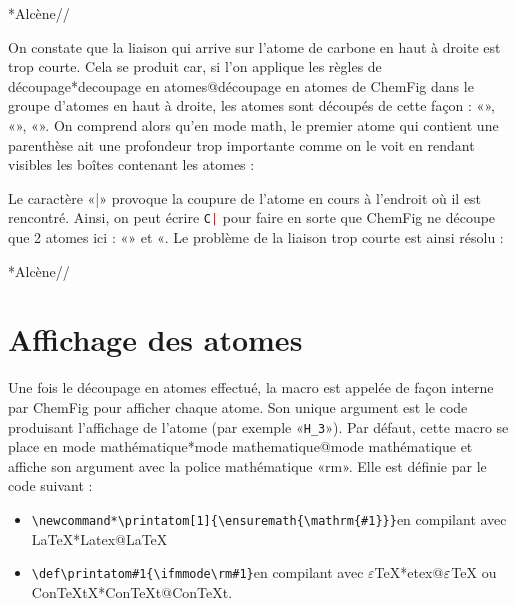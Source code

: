 \documentclass[10pt]{article}
\makeatletter
\newcommand\idx{\@ifstar{\let\print@or@not\@gobble\idx@}{\let\print@or@not\@firstofone\idx@}}
\newcommand\idx@[1]{%
	\ifcat\expandafter\noexpand\@car#1\@nil\relax%
		\expandafter\ifx\@car#1\@nil\protect
			\index{#1}%
			\print@or@not{#1}%
		\else
			\saveexpandmode\expandarg
			\StrSubstitute{\string#1}{\string @}{\@empty\protect\symbol{'100}}[\temp@]%
			\StrGobbleLeft\temp@1[\temp@]%
			\restoreexpandmode
			\expandafter\index\expandafter{\temp@ @\protect\texttt{\protect\textbackslash\temp@}}%
			\print@or@not{\texttt{\string#1}}%
		\fi
	\else
		\index{#1}%
		\print@or@not{#1}%
	\fi
}
\newcommand\make@car@active[1]{%
	\catcode`#1\active
	\begingroup
		\lccode`\~`#1\relax
		\lowercase{\endgroup\def~}%
}
\newif\if@exstar
\newcommand\exemple{%
	\begingroup
	\parskip\z@
	\@makeother\;\@makeother\!\@makeother\?\@makeother\:%
	\@ifstar{\@exstartrue\exemple@}{\@exstarfalse\exemple@}}
\newcommand\exemple@[2][65]{%
	\medbreak\noindent
	\begingroup
		\let\do\@makeother\dospecials
		\make@car@active\ { {}}%
		\make@car@active\^^M{\par\leavevmode}%
		\make@car@active\^^I{\space\space}%
		\make@car@active\,{\leavevmode\kern\z@\string,}%
		\make@car@active\-{\leavevmode\kern\z@\string-}%
		\make@car@active\>{\leavevmode\kern\z@\string>}%
		\make@car@active\<{\leavevmode\kern\z@\string<}%
		\exemple@@{#1}{#2}%
}
\newcommand\exemple@@[3]{%
	\def\@tempa##1#3{\exemple@@@{#1}{#2}{##1}}%
	\@tempa
}
\newcommand\exemple@@@[3]{%
	\xdef\the@code{#3}%
	\endgroup
	\if@exstar
		\begingroup
			\fboxrule0.4pt
			\let\breakboxparindent\z@
			\def\bkvz@bottom{\hrule\@height\fboxrule}%
			\let\bkvz@before@breakbox\relax
			\def\bkvz@set@linewidth{\advance\linewidth\dimexpr-2\fboxrule-2\fboxsep}%
			\def\bkvz@left{\vrule\@width\fboxrule\hskip\fboxsep}%
			\def\bkvz@right{\hskip\fboxsep\vrule\@width\fboxrule}%
			\def\bkvz@top{\hbox to \hsize{%
				\vrule\@width\fboxrule\@height\fboxrule
				\leaders\bkvz@bottom\hfill
				\ECFAugie
				\fboxsep\z@
				\colorbox{black}{\kern0.25em\color{white}\footnotesize\lower0.5ex\hbox{\strut#2}\kern0.25em}%
				\leaders\bkvz@bottom\hfill
				\vrule\@width\fboxrule\@height\fboxrule}}%
			\breakbox
				\kern.5ex\relax
				\ttfamily\footnotesize\the@code\par
				\normalfont
				\kern3pt
				\hrule height0.1pt width\linewidth depth0.1pt
				\vskip5pt
				\rightskip0pt plus 1fill
				\everypar{{\color{lightgray}\rlap{\vrule height0.1pt width\linewidth depth0.1pt}}\hskip0pt plus 1fill}%
				\newlinechar`\^^M\everyeof{\noexpand}\scantokens{#3}\par
			\endbreakbox
		\endgroup
	\else
		\vskip0.5ex
		\boxput*(0,1)
			{\fboxsep\z@
			\hbox{\ECFAugie\colorbox{black}{\leavevmode\kern0.25em{\color{white}\footnotesize\strut#2}\kern0.25em}}%
			}%
			{\fboxsep5pt
			\fbox{%
				$\vcenter{\hsize\dimexpr0.#1\linewidth-\fboxsep-\fboxrule\relax
					\kern5pt\parskip0pt \ttfamily\footnotesize\the@code}%
				\vcenter{\kern5pt\hsize\dimexpr\linewidth-0.#1\linewidth-\fboxsep-\fboxrule\relax
					\everypar{{\color{lightgray}\rlap{\vrule height0.1pt width\dimexpr\linewidth-0.#1\linewidth-\fboxsep-\fboxrule depth0.1pt}}}%
					\footnotesize\newlinechar`\^^M\everyeof{\noexpand}\scantokens{#3}}$%
				}%
			}%
	\fi
	\medbreak
	\endgroup
}
\let\do\@makeother\dospecials
\newcommand\CF{{\ECFAugie ChemFig}\xspace}
\makeatother
\begin{document}
\exemple*{Alcène}//

On constate que la liaison qui arrive sur l'atome de carbone en haut à droite est trop courte. Cela se produit car, si l'on applique les règles de découpage\idx*{decoupage en atomes@découpage en atomes} de \CF dans le groupe d'atomes en haut à droite, les atomes sont découpés de cette façon : «\texttt{}», «\texttt{}», «\texttt{}». On comprend alors qu'en mode math, le premier atome qui contient une parenthèse ait une profondeur trop importante comme on le voit en rendant visibles les boîtes contenant les atomes :
\begin{center}
\fboxsep=0pt
\renewcommand*\printatom[1]{\fbox{\ensuremath{\mathrm{#1}}}}%
%
\end{center}
Le caractère «|» provoque la coupure de l'atome en cours à l'endroit où il est rencontré. Ainsi, on peut écrire \texttt{C\textcolor{red}{|}} pour faire en sorte que \CF ne découpe que 2 atomes ici : «\texttt{}» et «\texttt{}. Le problème de la liaison trop courte est ainsi résolu :

\exemple*{Alcène}//

\section{Affichage des atomes}\label{perso.affichage}
Une fois le découpage en atomes effectué, la macro \idx{\printatom} est appelée de façon interne par \CF pour afficher chaque atome. Son unique argument est le code produisant l'affichage de l'atome (par exemple «\verb-H_3-»). Par défaut, cette macro se place en mode mathématique\idx*{mode mathematique@mode mathématique} et affiche son argument avec la police mathématique «rm». Elle est définie par le code suivant :
\begin{itemize}
	\item \verb|\newcommand*\printatom[1]{\ensuremath{\mathrm{#1}}}|\qquad en compilant avec \LaTeX{}\idx*{Latex@\protect\LaTeX}
	\item \verb|\def\printatom#1{\ifmmode\rm#1\else$\rm#1$\fi}|\qquad en compilant avec $\varepsilon$\TeX{}\idx*{etex@$\protect\varepsilon$\protect\TeX} ou Con\TeX tX\idx*{ConTeXt@Con\protect\TeX{}t}.
\end{itemize}\medskip
\end{document}
